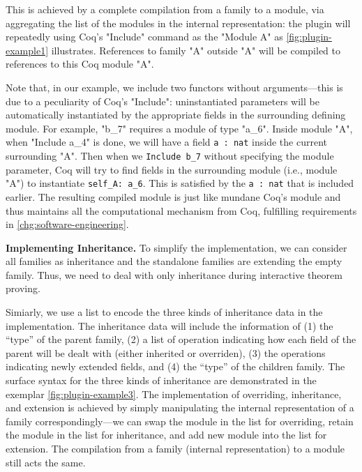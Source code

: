This is achieved by a complete compilation from a family to a module,
via aggregating the list of the modules in the internal representation:
the plugin will repeatedly using Coq's "Include" command as the "Module
A" as \cref{fig:plugin-example1} illustrates.
References to family "A" outside "A" will be compiled to references to
this Coq module "A".

Note that, in our example, we include two
functors without arguments---this is due to a peculiarity of Coq's
"Include": uninstantiated parameters will be automatically
instantiated by the appropriate fields in the surrounding defining
module.
For example, "b_7" requires a module of type "a_6". Inside module "A",
when "Include a_4" is done, we will have a field \texttt{a : nat}
inside the current surrounding "A". Then when we
\texttt{Include b_7} without specifying the module parameter,
Coq will try to find fields in the surrounding module (i.e., module
"A") to instantiate \texttt{self_A: a_6}. This is satisfied by
the \texttt{a : nat} that is included earlier.
The resulting compiled module is just like mundane Coq's module and 
thus maintains all the computational mechanism from Coq, fulfilling
requirements in \ref{chg:software-engineering}.



\textbf{Implementing Inheritance.}
To simplify the implementation, we can consider all families as
inheritance and the standalone families are extending the empty family.
Thus, we need to deal with only inheritance during interactive theorem proving.


Simiarly, we
use a list to encode the three kinds of inheritance data in the
implementation. The inheritance data will include the
information of (1) the ``type'' of the parent family, (2) a list of
operation indicating how each field of the parent will be dealt with
(either inherited or overriden), (3) the operations indicating newly
extended fields, and (4) the ``type'' of the children family.
The surface syntax for the three kinds of inheritance
are demonstrated in the exemplar \cref{fig:plugin-example3}. The
implementation of overriding, inheritance, and extension is achieved by
simply manipulating the internal representation of a family
correspondingly---we can swap the module in the list for overriding,
retain the module in the list for inheritance, and add new module into
the list for extension. The compilation from a family (internal
representation) to a module still acts the same.

